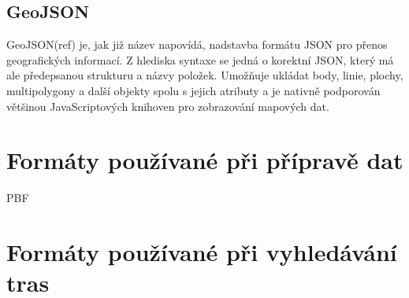 \subsection{GeoJSON}
GeoJSON(\TODO ref) je, jak již název napovídá, nadstavba formátu JSON pro přenos
geografických informací. Z hlediska syntaxe se jedná o korektní JSON, který má
ale předepsanou strukturu a názvy položek. Umožňuje ukládat body, linie, plochy,
multipolygony a další objekty spolu s jejich atributy a je nativně podporován
většinou JavaScriptových knihoven pro zobrazování mapových dat.

\section{Formáty používané při přípravě dat}
\TODO PBF
\section{Formáty používané při vyhledávání tras}
